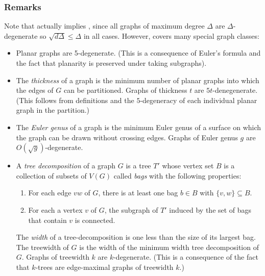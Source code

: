 \documentclass[lotsofwhite]{patmorin}
\begin{document}
\subsubsection{Remarks}

Note that  actually implies
, since all graphs of maximum degree $\Delta$
are $\Delta$-degenerate so $\sqrt{d\Delta}\le \Delta$ in all cases.
However,  covers many special
graph classes:

\begin{itemize}
  \item Planar graphs are 5-degenerate. (This is a consequence of Euler's
    formula and the fact that planarity is preserved under taking subgraphs).
  
  \item The \emph{thickness} of a graph is the minimum number of planar
    graphs into which the edges of $G$ can be partitioned. Graphs of
    thickness $t$ are $5t$-denegenerate.  (This follows from definitions
    and the $5$-degeneracy of each individual planar graph in the
    partition.)

  \item The \emph{Euler genus} of a graph is the minimum Euler genus of
    a surface on which the graph can be drawn without crossing edges.  Graphs of
    Euler genus $g$ are $O(\sqrt{g})$-degenerate.

  \item A \emph{tree decomposition} of a graph $G$ is a tree $T'$ whose
  vertex set $B$ is a collection of subsets of $V(G)$ called \emph{bags}
  with the following properties:
  \begin{enumerate}
    \item For each edge $vw$ of $G$, there is at least one bag $b\in B$
      with $\{v,w\}\subseteq B$.
    \item For each a vertex $v$ of $G$, the subgraph of $T'$ induced by
      the set of bags that contain $v$ is connected.
  \end{enumerate}
  The \emph{width} of a tree-decomposition is one less than the size
  of its largest bag.  The treewidth of $G$ is the width of the minimum
  width tree decomposition of $G$.
  Graphs of treewidth $k$ are $k$-degenerate. (This is a consequence
  of the fact that $k$-trees are edge-maximal graphs of treewidth $k$.)
\end{itemize} 
\end{document}
